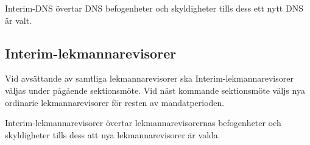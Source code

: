 Interim-DNS övertar DNS befogenheter och skyldigheter tills dess ett nytt DNS är valt.
\subsection{Interim-lekmannarevisorer}
Vid avsättande av samtliga lekmannarevisorer ska Interim-lekmannarevisorer väljas under pågående sektionsmöte.
Vid näst kommande sektionsmöte väljs nya ordinarie lekmannarevisorer för resten av mandatperioden.

Interim-lekmannarevisorer övertar lekmannarevisorernas befogenheter och skyldigheter tills dess att nya lekmannarevisorer är valda.
